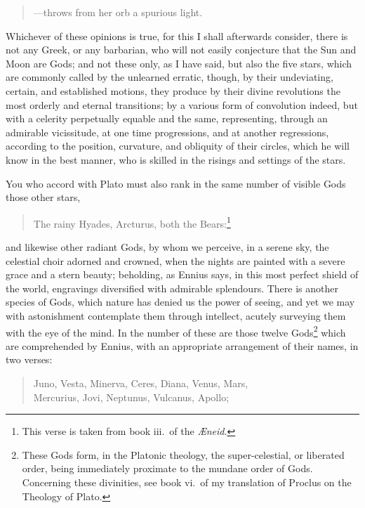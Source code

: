 \documentclass[12pt]{article}
\begin{document}
\begin{verse}
---throws from her orb a spurious light. 
\end{verse}

\noindent Whichever of these opinions is true, for this I shall afterwards
consider, there is not any Greek, or any barbarian, who will not easily
conjecture that the Sun and Moon are Gods; and not these only, as I have said,
but also the five stars, which are commonly called by the unlearned erratic,
though, by their undeviating, certain, and established motions, they produce by
their divine revolutions the most orderly and eternal transitions; by a various
form of convolution indeed, but with a celerity perpetually equable and the
same, representing, through an admirable vicissitude, at one time progressions,
and at another regressions, according to the position, curvature, and obliquity
of their circles, which he will know in the best manner, who is skilled in the
risings and settings of the stars.

You who accord with Plato must also rank in the same number of visible Gods
those other stars,

\begin{verse}
The rainy Hyades, Arcturus, both the Bears:\footnote{This verse is taken from
book iii.~of the \textit{{\AE}neid}.}
\end{verse}

\noindent and likewise other radiant Gods, by whom we perceive, in a serene
sky, the celestial choir adorned and crowned, when the nights are painted with
a severe grace and a stern beauty; beholding, as Ennius says, in this most
perfect shield of the world, engravings diversified with admirable splendours.
There is another species of Gods, which nature has denied us the power of
seeing, and yet we may with astonishment contemplate them through intellect,
acutely surveying them with the eye of the mind. In the number of these are
those twelve Gods\footnote{These Gods form, in the Platonic theology, the
super-celestial, or liberated order, being immediately proximate to the mundane
order of Gods. Concerning these divinities, see book vi.~of my translation of
Proclus on the Theology of Plato.} which are comprehended by Ennius,
with an appropriate arrangement of their names, in two verses:

\begin{verse}
Juno, Vesta, Minerva, Ceres, Diana, Venus, Mars,\\
Mercurius, Jovi, Neptunus, Vulcanus, Apollo;
\end{verse}
\end{document}
